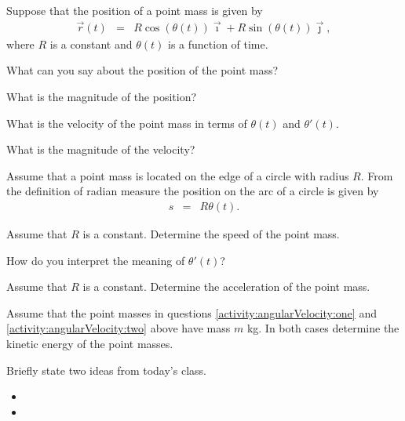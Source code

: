 \begin{problem}
\item Suppose that the position of a point mass is given by
  \begin{eqnarray*}
    \vec{r}(t) & = & R\cos(\theta(t)) \vec{\imath} + R\sin(\theta(t)) \vec{\jmath},
  \end{eqnarray*}
  where $R$ is a constant and $\theta(t)$ is a function of time.
  \label{activity:angularVelocity:one}
  \begin{subproblem}
  \item What can you say about the position of the point mass?
    \vfill
  \item What is the magnitude of the position?
    \vfill
  \item What is the velocity of the point mass in terms of $\theta(t)$
    and $\theta'(t)$. 
    \vfill
  \item What is the magnitude of the velocity?
    \vfill
  \end{subproblem}

  \clearpage

\item Assume that a point mass is located on the edge of a circle with
  radius $R$.  From the definition of radian measure the position on
  the arc of a circle is given by
  \begin{eqnarray*}
    s & = & R \theta(t).
  \end{eqnarray*}
  \label{activity:angularVelocity:two}
  \begin{subproblem}
  \item Assume that $R$ is a constant. Determine the speed of the
    point mass.
    \vfill
  \item How do you interpret the meaning of $\theta'(t)$?
    \vfill
  \item Assume that $R$ is a constant. Determine the acceleration of
    the point mass.  
    \vfill
  \end{subproblem}

\clearpage

\item Assume that the point masses in questions
  \ref{activity:angularVelocity:one} and
  \ref{activity:angularVelocity:two} above have mass $m$ kg. In both
  cases determine the kinetic energy of the point masses.

\end{problem}


\postClass

\begin{problem}
\item Briefly state two ideas from today's class.
  \begin{itemize}
  \item 
  \item 
  \end{itemize}
\item 
  \begin{subproblem}
    \item
  \end{subproblem}
\end{problem}



